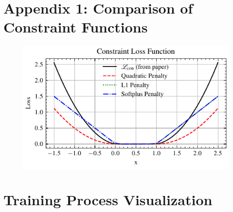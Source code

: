 \documentclass[11pt, oneside]{article}
\newcommand{\dert}[1]{\frac{{\rm d} {#1}}{{\rm d} t} }
\begin{document}






\clearpage
\section*{Appendix 1: Comparison of Constraint Functions}
\begin{figure}[H]
    \centering
    \includegraphics[width=0.8\linewidth]{figs/constraint_loss_functions.pdf}
    \caption*{}
\end{figure}

\section*{Training Process Visualization}
\end{document}
